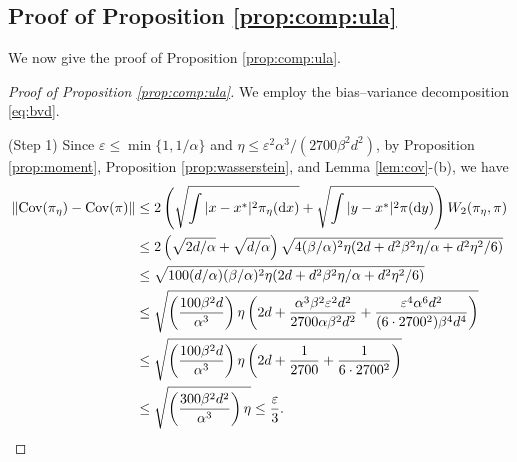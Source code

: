 \documentclass[12pt,reqno]{amsart}
\theoremstyle{remark}
\theoremstyle{definition}
\newcommand{\Cov}{\textnormal{Cov}}
\newcommand{\diff}{\mathrm{d}}
\renewcommand{\epsilon}{\varepsilon}
\begin{document}
\subsection{Proof of Proposition \ref{prop:comp:ula}}
We now give the proof of Proposition \ref{prop:comp:ula}.

\begin{proof}[Proof of Proposition \ref{prop:comp:ula}]
    We employ the bias--variance decomposition \eqref{eq:bvd}.

    (Step 1) Since $\epsilon\le \min\{1,1/\alpha\}$ and $\eta\le \epsilon^{2}\alpha^{3}/(2700\beta^{2}d^{2})$, by Proposition \ref{prop:moment}, Proposition \ref{prop:wasserstein}, and Lemma \ref{lem:cov}-(b), we have
    \begin{align*}
        \|\Cov(\pi_{\eta})-\Cov(\pi)\|&\le 2\left(\sqrt{\int|x-x^{\ast}|^{2}\pi_{\eta}(\diff x)}+\sqrt{\int|y-x^{\ast}|^{2}\pi(\diff y)}\right)W_{2}(\pi_{\eta},\pi)\\
        &\le 2\left(\sqrt{2d/\alpha}+\sqrt{d/\alpha}\right)\sqrt{4(\beta/\alpha)^{2}\eta(2d + d^{2}\beta^{2}\eta/\alpha + d^{2}\eta^{2}/6)}\\
        &\le \sqrt{100(d/\alpha)(\beta/\alpha)^{2}\eta(2d + d^{2}\beta^{2}\eta/\alpha + d^{2}\eta^{2}/6)}\\
        &\le \sqrt{\left(\frac{100\beta^{2}d}{\alpha^{3}}\right)\eta\left(2d +\frac{\alpha^{3}\beta^{2}\epsilon^{2}d^{2}}{2700\alpha\beta^{2}d^{2}} + \frac{\epsilon^{4}\alpha^{6}d^{2}}{(6\cdot 2700^{2})\beta^{4}d^{4}}\right)}\\
        &\le \sqrt{\left(\frac{100\beta^{2}d}{\alpha^{3}}\right)\eta\left(2d + \frac{1}{2700} + \frac{1}{6\cdot 2700^{2}}\right)}\\
        &\le \sqrt{\left(\frac{300\beta^{2}d^{2}}{\alpha^{3}}\right)\eta}\le \frac{\epsilon}{3}.
    \end{align*}


\end{proof}
\end{document}
